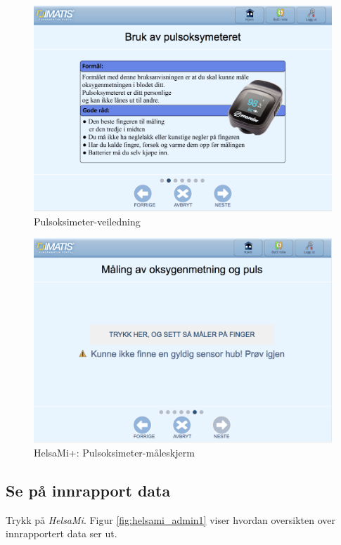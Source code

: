 \begin{figure}
\includegraphics[width=1.0\textwidth,center]{fig/helsami/pulsoksimeter_veiledning}
\caption{Pulsoksimeter-veiledning}
\label{fig:helsami_pulsoksimeter_veiledning}
\end{figure}

\begin{figure}
\includegraphics[width=1.0\textwidth,center]{fig/helsami/pulsoksimeter_maaling}
\caption{HelsaMi+: Pulsoksimeter-måleskjerm}
\label{fig:helsami_pulsoksimeter_maaling}
\end{figure}

\subsection{Se på innrapport data}
Trykk på \textit{HelsaMi}. Figur \ref{fig:helsami_admin1} viser hvordan oversikten over innrapportert data ser ut.

